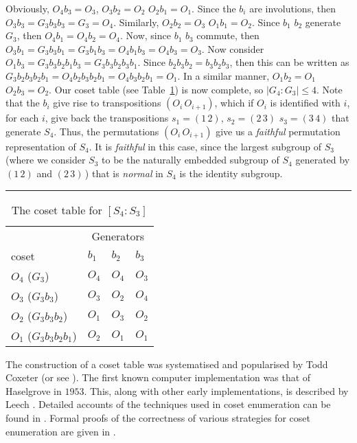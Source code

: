Obviously, $O_4b_3=O_3$, $O_3b_2=O_2$ \amp $O_2b_1=O_1$.
Since the $b_i$ are involutions, then $O_3b_3=G_3b_3b_3=G_3=O_4$.
Similarly, $O_2b_2=O_3$ \amp $O_1b_1=O_2$.
Since $b_1$ \amp $b_2$ generate $G_3$, then $O_4b_1=O_4b_2=O_4$.
Now, since $b_1$ \amp $b_3$ commute, then 
  $O_3b_1=G_3b_3b_1=G_3b_1b_3=O_4b_1b_3=O_4b_3=O_3$.
Now consider $O_1b_3=G_3b_3b_2b_1b_3=G_3b_3b_2b_3b_1$.
Since $b_2b_3b_2=b_3b_2b_3$, then this can be written as 
  $G_3b_2b_3b_2b_1=O_4b_2b_3b_2b_1=O_4b_3b_2b_1=O_1$.
In a similar manner, $O_1b_2=O_1$ \amp $O_2b_3=O_2$.
Our coset table (see Table~\ref{tab:dic}) is now complete, so 
  $|G_4 : G_3| \le 4$.
Note that the $b_i$ give rise to transpositions $(O_i\,O_{i+1})$,
  which if $O_i$ is identified with $i$, for each $i$, give back the 
  transpositions $s_1=(1\,2)$, $s_2=(2\,3)$ \amp $s_3=(3\,4)$ that 
  generate $S_4$.
Thus, the permutations $(O_i\,O_{i+1})$ give us a \emph{faithful} permutation
  representation of $S_4$. 
It is \emph{faithful} in this case, since the largest subgroup of $S_3$ 
  (where we consider $S_3$ to be the naturally embedded subgroup of $S_4$
  generated by $(1\,2)$ and $(2\,3)$\,)
  that is \emph{normal} in $S_4$ is the identity subgroup.

\begin{table}
\hrule
\caption{The coset table for $[S_4:S_3]$}
\label{tab:dic}
\smallskip
\renewcommand{\arraystretch}{0.875}
\begin{tabular*}{\textwidth}{@{\extracolsep{\fill}}llll} 
\hline\hline
 & \multicolumn{3}{c}{Generators} \\
\cline{2-4}
coset                   & $b_1$ & $b_2$ & $b_3$ \\ 
\hline
 $O_4$ ($G_3$)          & $O_4$ & $O_4$ & $O_3$ \\
 $O_3$ ($G_3b_3$)       & $O_3$ & $O_2$ & $O_4$ \\
 $O_2$ ($G_3b_3b_2$)    & $O_1$ & $O_3$ & $O_2$ \\
 $O_1$ ($G_3b_3b_2b_1$) & $O_2$ & $O_1$ & $O_1$ \\
\hline\hline
\end{tabular*}
\end{table}

The construction of a coset table was systematised and popularised by Todd
  \amp Coxeter \cite{TC36} (or see \cite[Chapter 2]{CM72}).
The first known computer implementation was that of Haselgrove in $1953$.
This, along with other early implementations, is described by Leech
  \cite{Lee63}.
Detailed accounts of the techniques used in coset enumeration can be found
  in \cite{CDHW73,Hav91,Lee84,Neu82,Sim94}.
Formal proofs of the correctness of various strategies for coset
  enumeration are given in \cite{Men64,Neu82,Sim94}.

